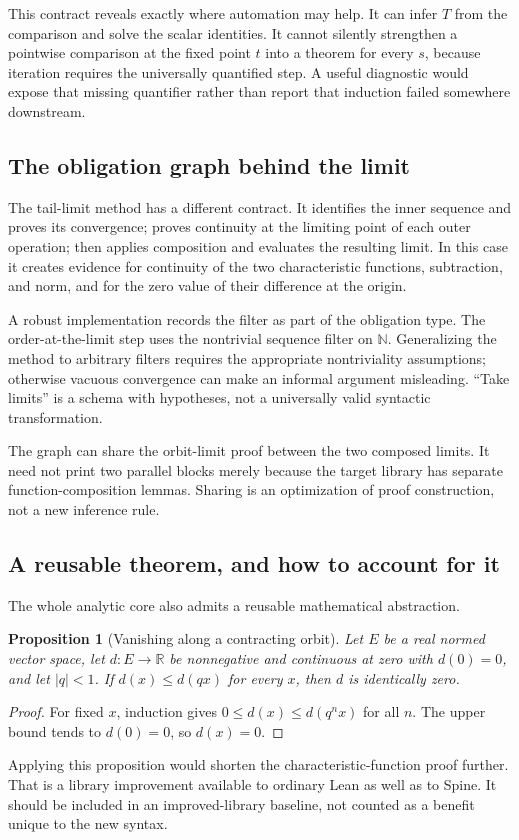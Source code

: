 \documentclass[11pt,letterpaper]{article}
\newtheorem{proposition}{Proposition}[section]
\theoremstyle{definition}
\theoremstyle{remark}
\newcommand{\N}{\mathbb N}
\newcommand{\R}{\mathbb R}
\newcommand{\Spine}{Spine}
\begin{document}
This contract reveals exactly where automation may help. It can infer $T$ from the comparison and solve the scalar identities. It cannot silently strengthen a pointwise comparison at the fixed point $t$ into a theorem for every $s$, because iteration requires the universally quantified step. A useful diagnostic would expose that missing quantifier rather than report that induction failed somewhere downstream.

\subsection{The obligation graph behind the limit}
The tail-limit method has a different contract. It identifies the inner sequence and proves its convergence; proves continuity at the limiting point of each outer operation; then applies composition and evaluates the resulting limit. In this case it creates evidence for continuity of the two characteristic functions, subtraction, and norm, and for the zero value of their difference at the origin.

A robust implementation records the filter as part of the obligation type. The order-at-the-limit step uses the nontrivial sequence filter on $\N$. Generalizing the method to arbitrary filters requires the appropriate nontriviality assumptions; otherwise vacuous convergence can make an informal argument misleading. ``Take limits'' is a schema with hypotheses, not a universally valid syntactic transformation.

The graph can share the orbit-limit proof between the two composed limits. It need not print two parallel blocks merely because the target library has separate function-composition lemmas. Sharing is an optimization of proof construction, not a new inference rule.

\subsection{A reusable theorem, and how to account for it}
The whole analytic core also admits a reusable mathematical abstraction.
\begin{proposition}[Vanishing along a contracting orbit]
Let $E$ be a real normed vector space, let $d:E\to\R$ be nonnegative and continuous at zero with $d(0)=0$, and let $|q|<1$. If $d(x)\le d(qx)$ for every $x$, then $d$ is identically zero.
\end{proposition}
\begin{proof}
For fixed $x$, induction gives $0\le d(x)\le d(q^nx)$ for all $n$. The upper bound tends to $d(0)=0$, so $d(x)=0$.
\end{proof}
Applying this proposition would shorten the characteristic-function proof further. That is a library improvement available to ordinary Lean as well as to \Spine{}. It should be included in an improved-library baseline, not counted as a benefit unique to the new syntax.
\end{document}
